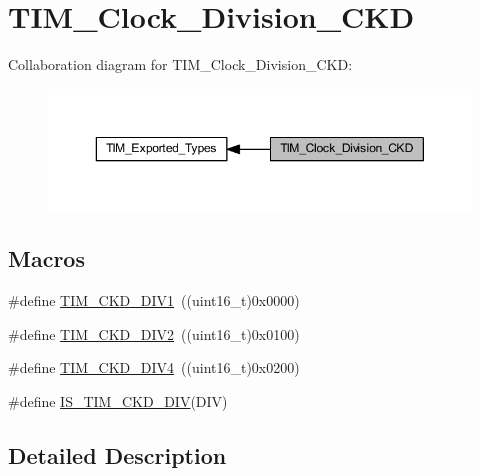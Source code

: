 \hypertarget{group___t_i_m___clock___division___c_k_d}{}\section{T\+I\+M\+\_\+\+Clock\+\_\+\+Division\+\_\+\+C\+KD}
\label{group___t_i_m___clock___division___c_k_d}
Collaboration diagram for T\+I\+M\+\_\+\+Clock\+\_\+\+Division\+\_\+\+C\+KD\+:
\nopagebreak
\begin{figure}[H]
\begin{center}
\leavevmode
\includegraphics[width=350pt]{group___t_i_m___clock___division___c_k_d}
\end{center}
\end{figure}
\subsection*{Macros}
\begin{DoxyCompactItemize}
\item 
\#define \hyperlink{group___t_i_m___clock___division___c_k_d_ga88691a07b3976791977d280045b3c850}{T\+I\+M\+\_\+\+C\+K\+D\+\_\+\+D\+I\+V1}~((uint16\+\_\+t)0x0000)
\item 
\#define \hyperlink{group___t_i_m___clock___division___c_k_d_ga46a5fd6a173a7e88528a6e4084a08665}{T\+I\+M\+\_\+\+C\+K\+D\+\_\+\+D\+I\+V2}~((uint16\+\_\+t)0x0100)
\item 
\#define \hyperlink{group___t_i_m___clock___division___c_k_d_gac2e5c030f964f9b4c92fa8129fb923bc}{T\+I\+M\+\_\+\+C\+K\+D\+\_\+\+D\+I\+V4}~((uint16\+\_\+t)0x0200)
\item 
\#define \hyperlink{group___t_i_m___clock___division___c_k_d_ga9298ec9ad2d578a4c54e6c0dd4c03946}{I\+S\+\_\+\+T\+I\+M\+\_\+\+C\+K\+D\+\_\+\+D\+IV}(D\+IV)
\end{DoxyCompactItemize}


\subsection{Detailed Description}


